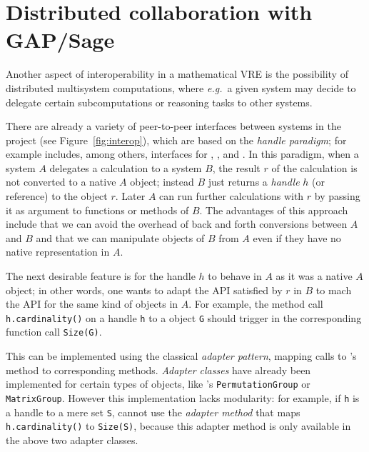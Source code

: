 \section{Distributed collaboration with GAP/Sage}\label{sec:gapsage}
\label{sec:handles}

Another aspect of interoperability in a mathematical VRE is the possibility of distributed
multisystem computations, where \emph{e.g.}\ a given system may decide to delegate
certain subcomputations or reasoning tasks to other systems.

There are already a variety of peer-to-peer interfaces between systems
in the \ODK project (see Figure~\ref{fig:interop}), which are based on
the \emph{handle paradigm}; for example \Sage includes, among others,
interfaces for \GAP, \Singular, and \Pari.
%
In this paradigm, when a system $A$ delegates a calculation to a system $B$, the
result $r$ of the calculation is not converted to a native $A$ object; instead $B$ just
returns a \emph{handle} $h$ (or reference) to the object $r$. Later $A$ can run further calculations
with $r$ by passing it as argument to functions or methods of $B$. The advantages of this
approach include that we can avoid the overhead of back and forth conversions between $A$
and $B$ and that we can manipulate objects of $B$ from $A$ even if they have no native
representation in $A$.

The next desirable feature is for the handle $h$ to behave in $A$ as
it was a native $A$ object; in other words, one wants to adapt the API
satisfied by $r$ in $B$ to mach the API for the same kind of objects
in $A$. For example, the method call \texttt{h.cardinality()} on a
\Sage handle \texttt{h} to a \GAP object \texttt{G} should trigger in
\GAP the corresponding function call \texttt{Size(G)}.

This can be implemented using the classical \emph{adapter
  pattern}, mapping calls to \Sage's method to corresponding \GAP
methods. \emph{Adapter classes} have already been implemented for
certain types of objects, like \Sage's \texttt{PermutationGroup} or
\texttt{MatrixGroup}. However this implementation lacks modularity:
for example, if \texttt{h} is a handle to a mere set \texttt{S}, \Sage
cannot use the \emph{adapter method} that maps
\texttt{h.cardinality()} to \texttt{Size(S)}, because this adapter
method is only available in the above two adapter classes.

